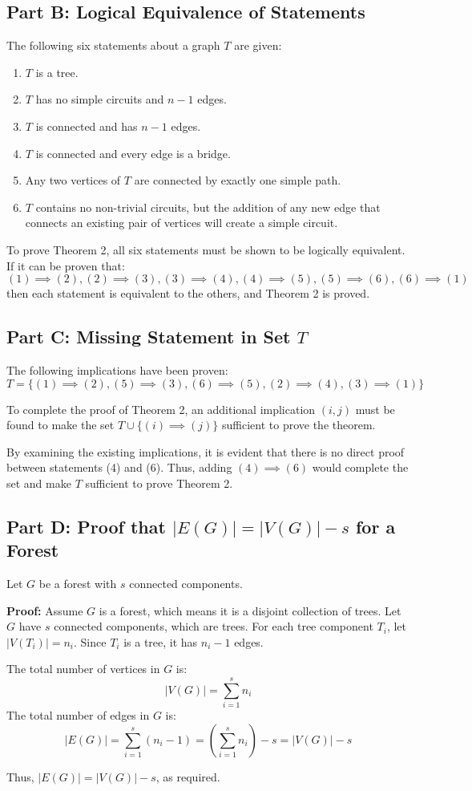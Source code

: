 \documentclass{article}
\begin{document}
	\subsection*{Part B: Logical Equivalence of Statements}
	The following six statements about a graph $ T $ are given:
	\begin{enumerate}
		\item $ T $ is a tree.
		\item $ T $ has no simple circuits and $ n - 1 $ edges.
		\item $ T $ is connected and has $ n - 1 $ edges.
		\item $ T $ is connected and every edge is a bridge.
		\item Any two vertices of $ T $ are connected by exactly one simple path.
		\item $ T $ contains no non-trivial circuits, but the addition of any new edge that connects an existing pair of vertices will create a simple circuit.
	\end{enumerate}
	
	To prove Theorem 2, all six statements must be shown to be logically equivalent. If it can be proven that:
	\[(1) \implies (2), (2) \implies (3), (3) \implies (4), (4) \implies (5), (5) \implies (6), (6) \implies (1)\]
	then each statement is equivalent to the others, and Theorem 2 is proved.
	
	\subsection*{Part C: Missing Statement in Set $ T $}
	The following implications have been proven:
	\[T = \{(1) \implies (2), (5) \implies (3), (6) \implies (5), (2) \implies (4), (3) \implies (1)\}\]
	
	To complete the proof of Theorem 2, an additional implication $(i, j)$ must be found to make the set $ T \cup \{(i) \implies (j)\} $ sufficient to prove the theorem.
	
	By examining the existing implications, it is evident that there is no direct proof between statements (4) and (6). Thus, adding $(4) \implies (6)$ would complete the set and make $ T $ sufficient to prove Theorem 2.
	
	\subsection*{Part D: Proof that $ |E(G)| = |V(G)| - s $ for a Forest}
	Let $ G $ be a forest with $ s $ connected components.
	
	\textbf{Proof:}
	Assume $ G $ is a forest, which means it is a disjoint collection of trees. Let $ G $ have $ s $ connected components, which are trees. For each tree component $ T_i $, let $ |V(T_i)| = n_i $. Since $ T_i $ is a tree, it has $ n_i - 1 $ edges.
	
	The total number of vertices in $ G $ is:
	\[|V(G)| = \sum_{i=1}^{s} n_i\]
	The total number of edges in $ G $ is:
	\[|E(G)| = \sum_{i=1}^{s} (n_i - 1) = \left( \sum_{i=1}^{s} n_i \right) - s = |V(G)| - s\]
	
	Thus, $ |E(G)| = |V(G)| - s $, as required.
	
\end{document}
